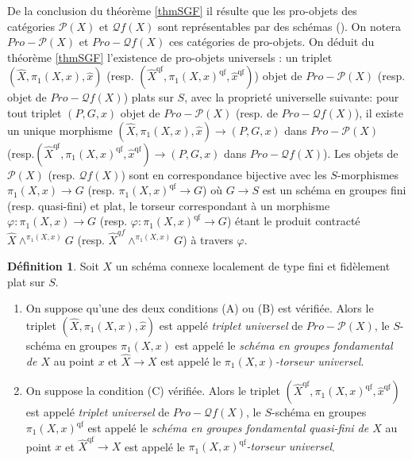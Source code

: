 \documentclass[11pt]{amsart}
\numberwithin{equation}{section}
\theoremstyle{definition}
\newtheorem{defi}[thm]{D\'efinition}
\theoremstyle{remark}
\begin{document}
De la conclusion du th\'eor\`eme \ref{thmSGF} il r\'esulte que les pro-objets des cat\'egories $\mathcal{P}(X)$ et $\mathcal{Q}f(X)$ sont repr\'esentables par des sch\'emas (\cite[prop. 8.2.3]{EGAIV-3}).  On notera $Pro-\mathcal{P}(X)$  et $Pro-\mathcal{Q}f(X)$ ces cat\'egories de pro-objets. On d\'eduit du th\'eor\`eme \ref{thmSGF} l'existence de pro-objets universels : un triplet $(\widehat{X},\pi_1(X,x),\widehat{x})$ (resp. $(\widehat{X}^{\text{qf}},\pi_1(X,x)^{\text{qf}},\widehat{x}^{\text{qf}})$) objet de $Pro-\mathcal{P}(X)$ (resp. objet de $Pro-\mathcal{Q}f(X)$) plats sur $S$, avec la propriet\'e universelle suivante: pour tout triplet $(P,G,x)$ objet de $Pro-\mathcal{P}(X)$ (resp. de $Pro-\mathcal{Q}f(X)$), il existe un unique morphisme $(\widehat{X},\pi_1(X,x),\widehat{x})\to (P,G,x)$ dans  $Pro-\mathcal{P}(X)$ (resp.$(\widehat{X}^{\text{qf}},\pi_1(X,x)^{\text{qf}},\widehat{x}^{\text{qf}})\to (P,G,x)$ dans $Pro-\mathcal{Q}f(X)$). Les objets de $\mathcal{P}(X)$ (resp. $\mathcal{Q}f(X)$) sont en correspondance bijective avec les $S$-morphismes $\pi_1(X,x) \to G$ (resp. $\pi_1(X,x)^{\text{qf}} \to G$) o\`u $G\to S$ est un sch\'ema en groupes fini (resp. quasi-fini) et plat, le torseur correspondant \`a un morphisme  $\varphi :\pi_1(X,x) \to G$ (resp. $\varphi :\pi_1(X,x)^{\text{qf}} \to G$) \'etant le produit contract\'e $\widehat X \wedge ^{\pi _1 (X,x)}G$ (resp. $\widehat X^{qf} \wedge ^{\pi _1 (X,x)}G$) \`a travers $\varphi $.



\begin{defi} Soit $X$ un sch\'ema connexe localement de type fini et fid\`element plat sur $S$.

\begin{enumerate} \item On suppose qu'une des deux conditions (A) ou (B) est v\'erifi\'ee. Alors le triplet  $(\widehat{X},\pi_1(X,x),\widehat{x})$ est appel\'e {\it triplet universel} de  $Pro-\mathcal{P}(X)$, le $S$-sch\'ema en groupes $\pi_1(X,x)$  est appel\'e le {\it sch\'ema en groupes fondamental de $X$}  au point $x$ et $\widehat{X}\to X$ est  appel\'e le {\it $\pi_1(X,x)$-torseur universel}.

\item On suppose la condition (C) v\'erifi\'ee. Alors le triplet  $(\widehat{X}^{\text{qf}},\pi_1(X,x)^{\text{qf}},\widehat{x}^{\text{qf}})$ est appel\'e {\it triplet universel} de  $Pro-\mathcal{Q}f(X)$, le $S$-sch\'ema en groupes $\pi_1(X,x)^{\text{qf}}$  est appel\'e le {\it sch\'ema en groupes fondamental quasi-fini de $X$}  au point $x$ et $\widehat{X}^{\text{qf}}\to X$ est  appel\'e le {\it $\pi_1(X,x)^{\text{qf}}$-torseur universel}.
\end{enumerate}
\end{defi}
\end{document}
